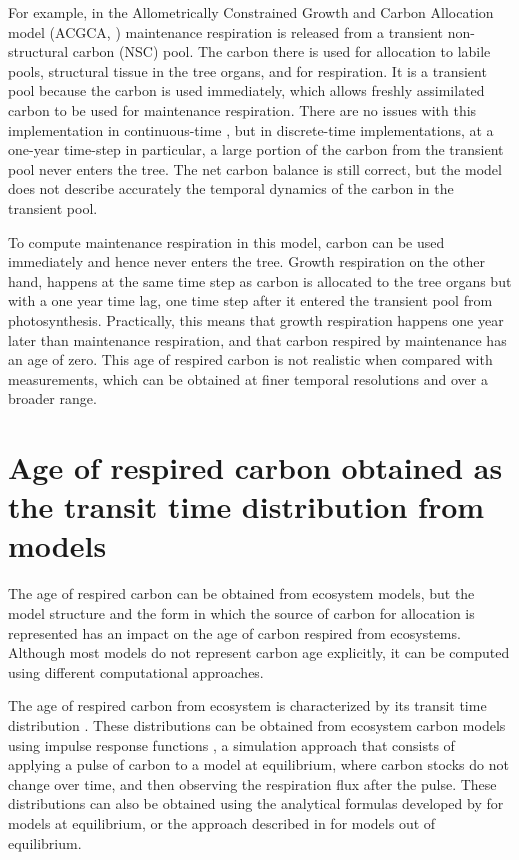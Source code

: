 \documentclass[bg, manuscript]{copernicus}
\begin{document}
For example, in the Allometrically Constrained Growth and Carbon Allocation model (ACGCA, \citet{Ogle2009}) maintenance respiration is released from a transient non-structural carbon (NSC) pool.
The carbon there is used for allocation to labile pools, structural tissue in the tree organs, and for respiration.
It is a transient pool because the carbon is used immediately, which allows freshly assimilated carbon to be used  for maintenance respiration.
There are no issues with this implementation in continuous-time \citep{Herrera2020}, but in discrete-time implementations, at a one-year time-step in particular, a large portion of the carbon from the transient pool
never enters the tree.
The net carbon balance is still correct, but the model does not describe accurately the temporal dynamics of the carbon in the transient pool.

To compute maintenance respiration in this model, carbon can be used immediately and hence never enters the tree. Growth respiration on the other hand, happens at the same time step as carbon is allocated to the tree organs but with a one year time lag, one time step after it entered the transient pool from photosynthesis.
Practically, this means that growth respiration happens one year later than maintenance respiration, and that carbon respired by maintenance has an age of zero. 
This age of respired carbon is not realistic when compared with measurements, which can be obtained at finer temporal resolutions and over a broader range. 

\section{Age of respired carbon obtained as the transit time distribution from models}
The age of respired carbon can be obtained from ecosystem models, but the model structure and the form in which the source of carbon for allocation is represented has an impact on the age of carbon respired from ecosystems. Although most models do not represent carbon age explicitly, it can be computed using different computational approaches.

The age of respired carbon from ecosystem is characterized by its transit time distribution \citep{Bolin1973, Thompson1999, Sierra2021JE}. These distributions can be obtained from ecosystem carbon models using impulse response functions \citep{Thompson1999}, a simulation approach that consists of applying a pulse of carbon to a model at equilibrium, where carbon stocks do not change over time, and then observing the respiration flux after the pulse. These distributions can also be obtained using the analytical formulas developed by \citet{Metzler2018MG} for models at equilibrium, or the approach described in \citet{Metzler2018PNAS} for models out of equilibrium.
\end{document}
